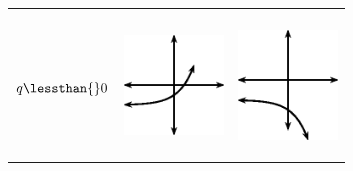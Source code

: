 \begin{center}
\begin{xtabular*}{\mytablewidth}[t]{|p{10\mystarwidth}|p{10\mystarwidth}|p{10\mystarwidth}|}
\begin{center}
\vspace{2pt}
\vspace{.1in}
\end{center}    
\tabularnewline{}
    $q\lessthan{}0$
    &
\setcounter{subfigure}{0}
\label{m39348*id250596}
\begin{center}
\label{m39348*id250596!!!underscore!!!media}\label{m39348*id250596!!!underscore!!!printimage}\includegraphics[width=100px]{col11306.imgs/m39348_MG10C11_030.png} %
\vspace{2pt}
\vspace{.1in}
\end{center}    
    &
\setcounter{subfigure}{0}
\label{m39348*id250608}
\begin{center}
\label{m39348*id250608!!!underscore!!!media}\label{m39348*id250608!!!underscore!!!printimage}\includegraphics[width=100px]{col11306.imgs/m39348_MG10C11_031.png} %
\vspace{2pt}
\vspace{.1in}
\end{center}    
\tabularnewline{}
\end{xtabular*}
\end{center}
